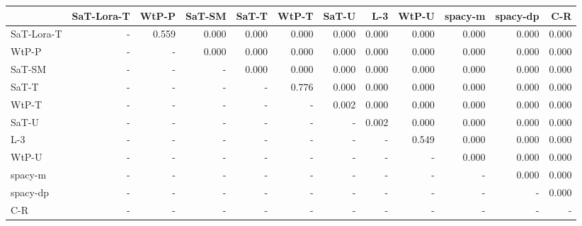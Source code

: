 \begin{tabular}{lrrrrrrrrrrr}
\toprule
 & SaT-Lora-T & WtP-P & SaT-SM & SaT-T & WtP-T & SaT-U & L-3 & WtP-U & spacy-m & spacy-dp & C-R \\
\midrule
SaT-Lora-T & - & 0.559 & 0.000 & 0.000 & 0.000 & 0.000 & 0.000 & 0.000 & 0.000 & 0.000 & 0.000 \\
WtP-P & - & - & 0.000 & 0.000 & 0.000 & 0.000 & 0.000 & 0.000 & 0.000 & 0.000 & 0.000 \\
SaT-SM & - & - & - & 0.000 & 0.000 & 0.000 & 0.000 & 0.000 & 0.000 & 0.000 & 0.000 \\
SaT-T & - & - & - & - & 0.776 & 0.000 & 0.000 & 0.000 & 0.000 & 0.000 & 0.000 \\
WtP-T & - & - & - & - & - & 0.002 & 0.000 & 0.000 & 0.000 & 0.000 & 0.000 \\
SaT-U & - & - & - & - & - & - & 0.002 & 0.000 & 0.000 & 0.000 & 0.000 \\
L-3 & - & - & - & - & - & - & - & 0.549 & 0.000 & 0.000 & 0.000 \\
WtP-U & - & - & - & - & - & - & - & - & 0.000 & 0.000 & 0.000 \\
spacy-m & - & - & - & - & - & - & - & - & - & 0.000 & 0.000 \\
spacy-dp & - & - & - & - & - & - & - & - & - & - & 0.000 \\
C-R & - & - & - & - & - & - & - & - & - & - & - \\
\bottomrule
\end{tabular}

